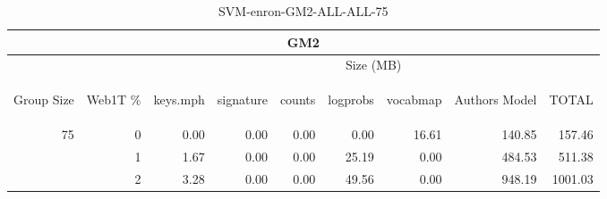 \begin{center}
\begin{table}[htbp] 
 \begin{center}
\begin{tabular}{ | r | r | r | r | r | r | r | r | r |}
\hline
\multicolumn{9}{|c|}{GM2}\\
\hline
 & & \multicolumn{7}{|c|}{Size (MB)}\\ \cline{3-9}
\begin{sideways}Group Size\end{sideways} & \begin{sideways}Web1T \% \end{sideways} & \begin{sideways}keys.mph\end{sideways} & \begin{sideways}signature\end{sideways} & \begin{sideways}counts\end{sideways} & \begin{sideways}logprobs\end{sideways} & \begin{sideways}vocabmap\end{sideways} & \begin{sideways}Authors Model \end{sideways} & \begin{sideways}TOTAL\end{sideways}\\
\hline
\multirow{2}{*}{75}
 & 0 & 0.00 & 0.00 & 0.00 & 0.00 & 16.61 & 140.85 & 157.46\\ \cline{2-9}
 & 1 & 1.67 & 0.00 & 0.00 & 25.19 & 0.00 & 484.53 & 511.38\\ \cline{2-9}
 & 2 & 3.28 & 0.00 & 0.00 & 49.56 & 0.00 & 948.19 & 1001.03\\ \cline{2-9}
\hline
\end{tabular}
\caption{SVM-enron-GM2-ALL-ALL-75}
\label{table:SVM-enron-GM2-ALL-ALL-75}
\end{center}
 \end{table}
\end{center}

